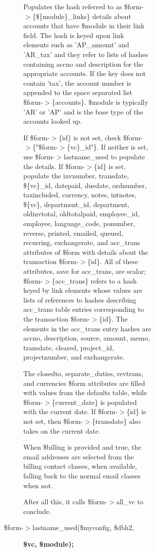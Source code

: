 \begin{description}
\begin{description}
\begin{description}
\begin{description}
\begin{description}
\begin{description}
Populates the hash referred to as \$form-$>$\{\$\{module\}\_links\} details about
accounts that have \$module in their link field.  The hash is keyed upon link
elements such as 'AP\_amount' and 'AR\_tax' and they refer to lists of hashes
containing accno and description for the appropriate accounts.  If the key does
not contain 'tax', the account number is appended to the space separated list
\$form-$>$\{accounts\}.  \$module is typically 'AR' or 'AP' and is the base type of
the accounts looked up.



If \$form-$>$\{id\} is not set, check \$form-$>$\{"\$form-$>$\{vc\}\_id"\}.  If neither is set,
use \$form-$>$lastname\_used to populate the details.  If \$form-$>$\{id\} is set,
populate the invnumber, transdate, \$\{vc\}\_id, datepaid, duedate, ordnumber,
taxincluded, currency, notes, intnotes, \$\{vc\}, department\_id, department,
oldinvtotal, oldtotalpaid, employee\_id, employee, language\_code, ponumber, 
reverse, printed, emailed, queued, recurring, exchangerate, and acc\_trans
attributes of \$form with details about the transaction \$form-$>$\{id\}.  All of
these attributes, save for acc\_trans, are scalar; \$form-$>$\{acc\_trans\} refers to
a hash keyed by link elements whose values are lists of references to hashes
describing acc\_trans table entries corresponding to the transaction \$form-$>$\{id\}.
The elements in the acc\_trans entry hashes are accno, description, source,
amount, memo, transdate, cleared, project\_id, projectnumber, and exchangerate.



The closedto, separate\_duties, revtrans, and currencies \$form attributes are filled with values
from the defaults table, while \$form-$>$\{current\_date\} is populated with the
current date.  If \$form-$>$\{id\} is not set, then \$form-$>$\{transdate\} also takes on
the current date.



When \$billing is provided and true, the email addresses are selected
from the billing contact classes, when available, falling back to the
normal email classes when not.



After all this, it calls \$form-$>$all\_vc to conclude.


\item[{\$form-$>$lastname\_used(\$myconfig, \$dbh2,}] \textbf{\$vc, \$module);}


\end{description}
\end{description}
\end{description}
\end{description}
\end{description}
\end{description}
